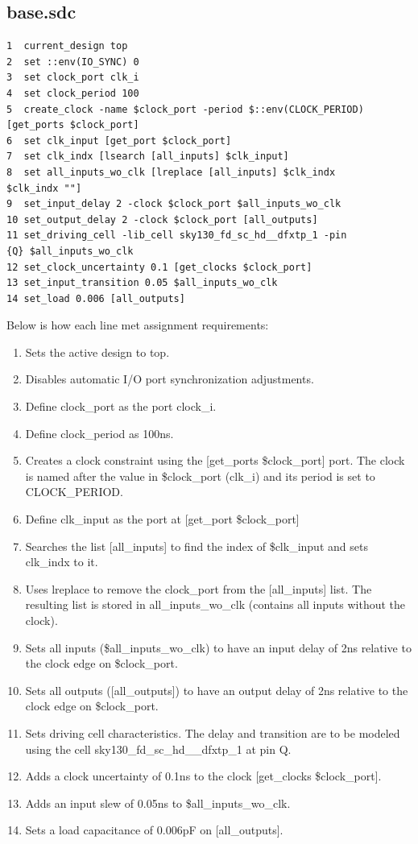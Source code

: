 \documentclass{article}
\begin{document}
\begin{flushleft}
\subsection{base.sdc}
\begin{lstlisting}
1  current_design top
2  set ::env(IO_SYNC) 0
3  set clock_port clk_i
4  set clock_period 100
5  create_clock -name $clock_port -period $::env(CLOCK_PERIOD)
[get_ports $clock_port]
6  set clk_input [get_port $clock_port]
7  set clk_indx [lsearch [all_inputs] $clk_input]
8  set all_inputs_wo_clk [lreplace [all_inputs] $clk_indx
$clk_indx ""]
9  set_input_delay 2 -clock $clock_port $all_inputs_wo_clk
10 set_output_delay 2 -clock $clock_port [all_outputs]
11 set_driving_cell -lib_cell sky130_fd_sc_hd__dfxtp_1 -pin
{Q} $all_inputs_wo_clk
12 set_clock_uncertainty 0.1 [get_clocks $clock_port]
13 set_input_transition 0.05 $all_inputs_wo_clk
14 set_load 0.006 [all_outputs]
\end{lstlisting}
\noindent\makebox[\linewidth]{\rule{\paperwidth}{0.4pt}}
{\large Below is how each line met assignment requirements:}
\begin{enumerate}
\item Sets the active design to top.
\item Disables automatic I/O port synchronization adjustments.
\item Define clock\_port as the port clock\_i.
\item Define clock\_period as 100ns.
\item Creates a clock constraint using the [get\_ports \$clock\_port] port. The clock is named after the value in \$clock\_port (clk\_i) and its period is set to CLOCK\_PERIOD.
\item Define clk\_input as the port at [get\_port \$clock\_port]
\item Searches the list [all\_inputs] to find the index of \$clk\_input and sets clk\_indx to it.
\item Uses lreplace to remove the clock\_port from the [all\_inputs] list. The resulting list is stored in all\_inputs\_wo\_clk (contains all inputs without the clock).
\item Sets all inputs (\$all\_inputs\_wo\_clk) to have an input delay of 2ns relative to the clock edge on \$clock\_port.
\item Sets all outputs ([all\_outputs]) to have an output delay of 2ns relative to the clock edge on \$clock\_port. 
\item Sets driving cell characteristics. The delay and transition are to be modeled using the cell sky130\_fd\_sc\_hd\_\_dfxtp\_1 at pin Q.
\item Adds a clock uncertainty of 0.1ns to the clock [get\_clocks \$clock\_port]. 
\item Adds an input slew of 0.05ns to \$all\_inputs\_wo\_clk.
\item Sets a load capacitance of 0.006pF on [all\_outputs].
\end{enumerate}
\noindent\makebox[\linewidth]{\rule{\paperwidth}{0.4pt}}

\end{flushleft}
\end{document}
